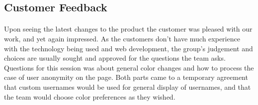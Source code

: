 \subsection{Customer Feedback}

\paragraph{} Upon seeing the latest changes to the product the customer was pleased with our work, and yet again impressed. As the customers don't have much experience with the technology being used and web development, the group's judgement and choices are usually sought and approved for the questions the team asks. Questions for this session was about general color changes and how to process the case of user anonymity on the page. Both parts came to a temporary agreement that custom usernames would be used for general display of usernames, and that the team would choose color preferences as they wished. 
